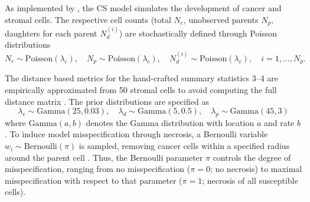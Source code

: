 \documentclass[twoside,11pt]{article}
\newcommand{\0}{\boldsymbol{0}}
\renewcommand{\cite}[1]{\citep{#1}}
\begin{document}
As implemented by \citet{ward_robust_2022}, the CS model simulates the development of cancer and stromal cells.
The respective cell counts (total $N_c$, unobserved parents $N_p$, daughters for each parent $N_d^{(i)}$) are stochastically defined through Poisson distributions
\begin{equation}
        N_c \sim \mathrm{Poisson}(\lambda_c),\quad N_p \sim \mathrm{Poisson}(\lambda_c),\quad N_d^{(i)} \sim \mathrm{Poisson}(\lambda_c),\quad i=1,\ldots, N_p.
\end{equation}

The distance based metrics for the hand-crafted summary statistics 3--4 are empirically approximated from 50 stromal cells to avoid computing the full distance matrix \cite{ward_robust_2022}.
The prior distributions are specified as 
\begin{equation}
        \lambda_c \sim \mathrm{Gamma}(25, 0.03),\quad
        \lambda_d \sim \mathrm{Gamma}(5, 0.5),\quad
        \lambda_p \sim \mathrm{Gamma}(45, 3)
\end{equation}
where $\mathrm{Gamma}(a, b)$ denotes the Gamma distribution with location $a$ and rate $b$.
To induce model misspecification through necrosis, a Bernoulli variable $w_i\sim\mathrm{Bernoulli}(\pi)$ is sampled, removing cancer cells within a specified radius around the parent cell \cite{ward_robust_2022}.
Thus, the Bernoulli parameter $\pi$ controls the degree of misspecification, ranging from no misspecification ($\pi=0$; no necrosis) to maximal misspecification with respect to that parameter ($\pi=1$; necrosis of all susceptible cells).
\end{document}
